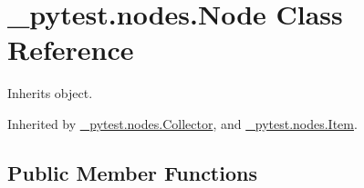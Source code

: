 \hypertarget{class__pytest_1_1nodes_1_1_node}{}\section{\+\_\+pytest.\+nodes.\+Node Class Reference}
\label{class__pytest_1_1nodes_1_1_node}


Inherits object.



Inherited by \hyperlink{class__pytest_1_1nodes_1_1_collector}{\+\_\+pytest.\+nodes.\+Collector}, and \hyperlink{class__pytest_1_1nodes_1_1_item}{\+\_\+pytest.\+nodes.\+Item}.

\subsection*{Public Member Functions}
